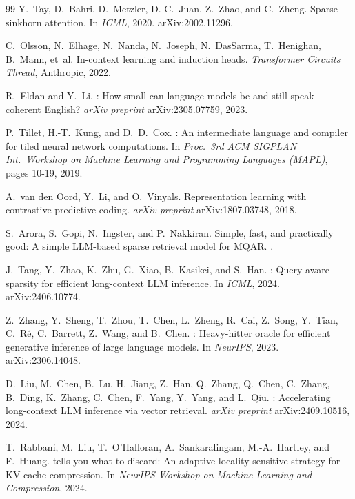 \documentclass[10pt,letterpaper]{article}
\begin{document}
\begin{thebibliography}{99}
Y.~Tay, D.~Bahri, D.~Metzler, D.-C.~Juan, Z.~Zhao, and C.~Zheng.
\newblock Sparse sinkhorn attention.
\newblock In \emph{ICML}, 2020. arXiv:2002.11296.

C.~Olsson, N.~Elhage, N.~Nanda, N.~Joseph, N.~DasSarma, T.~Henighan, B.~Mann,
  et~al.
\newblock In-context learning and induction heads.
\newblock \emph{Transformer Circuits Thread}, Anthropic, 2022.

R.~Eldan and Y.~Li.
: How small can language models be and still speak
  coherent {English}?
\newblock \emph{arXiv preprint} arXiv:2305.07759, 2023.

P.~Tillet, H.-T.~Kung, and D.~D.~Cox.
: An intermediate language and compiler for tiled neural
  network computations.
\newblock In \emph{Proc.\ 3rd ACM SIGPLAN Int.\ Workshop on Machine Learning
  and Programming Languages (MAPL)}, pages 10-19, 2019.

A.~van den Oord, Y.~Li, and O.~Vinyals.
\newblock Representation learning with contrastive predictive coding.
\newblock \emph{arXiv preprint} arXiv:1807.03748, 2018.

S.~Arora, S.~Gopi, N.~Ingster, and P.~Nakkiran.
\newblock Simple, fast, and practically good: A simple {LLM}-based sparse
  retrieval model for {MQAR}.
.

J.~Tang, Y.~Zhao, K.~Zhu, G.~Xiao, B.~Kasikci, and S.~Han.
: Query-aware sparsity for efficient long-context {LLM}
  inference.
\newblock In \emph{ICML}, 2024. arXiv:2406.10774.

Z.~Zhang, Y.~Sheng, T.~Zhou, T.~Chen, L.~Zheng, R.~Cai, Z.~Song, Y.~Tian,
  C.~R\'e, C.~Barrett, Z.~Wang, and B.~Chen.
: Heavy-hitter oracle for efficient generative inference of large
  language models.
\newblock In \emph{NeurIPS}, 2023. arXiv:2306.14048.

D.~Liu, M.~Chen, B.~Lu, H.~Jiang, Z.~Han, Q.~Zhang, Q.~Chen, C.~Zhang, B.~Ding,
  K.~Zhang, C.~Chen, F.~Yang, Y.~Yang, and L.~Qiu.
: Accelerating long-context {LLM} inference via
  vector retrieval.
\newblock \emph{arXiv preprint} arXiv:2409.10516, 2024.

T.~Rabbani, M.~Liu, T.~O'Halloran, A.~Sankaralingam, M.-A.~Hartley, and
  F.~Huang.
 tells you what to discard: An adaptive locality-sensitive
  strategy for {KV} cache compression.
\newblock In \emph{NeurIPS Workshop on Machine Learning and Compression}, 2024.


\end{thebibliography}
\end{document}
